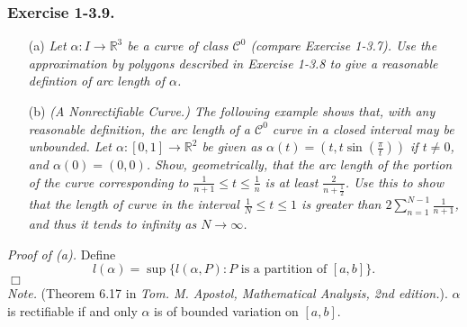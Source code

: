 \documentclass{article}
\begin{document}



\subsubsection*{Exercise 1-3.9.}
\begin{enumerate}
\item[(a)]
  \emph{Let $\alpha: I \to \mathbb{R}^3$ be a curve of class $\mathcal{C}^{0}$
  (compare Exercise 1-3.7).
  Use the approximation by polygons described in Exercise 1-3.8 to give
  a reasonable defintion of arc length of $\alpha$.}

\item[(b)]
  \emph{(A Nonrectifiable Curve.)
  The following example shows that, with any reasonable definition,
  the arc length of a $\mathcal{C}^{0}$ curve in a closed interval may be unbounded.
  Let $\alpha:[0,1] \to \mathbb{R}^2$ be given as
  $\alpha(t) = (t, t \sin(\frac{\pi}{t}))$ if $t \neq 0$,
  and $\alpha(0) = (0,0)$.
  Show, geometrically, that the arc length of the portion of the curve corresponding to
  $\frac{1}{n+1} \leq t \leq \frac{1}{n}$ is at least $\frac{2}{n + \frac{1}{2}}$.
  Use this to show that the length of curve in the interval $\frac{1}{N} \leq t \leq 1$
  is greater than $2 \sum_{n=1}^{N-1} \frac{1}{n+1}$,
  and thus it tends to infinity as $N \to \infty$.} \\
\end{enumerate}



\emph{Proof of (a).}
Define
\[
  l(\alpha) = \sup \{ l(\alpha,P) : P \text{ is a partition of } [a,b] \}.
\]
$\Box$ \\

\emph{Note.}
(Theorem 6.17 in \emph{Tom. M. Apostol, Mathematical Analysis, 2nd edition.}).
$\alpha$ is rectifiable if and only $\alpha$ is of bounded variation on $[a,b]$. \\
\end{document}

